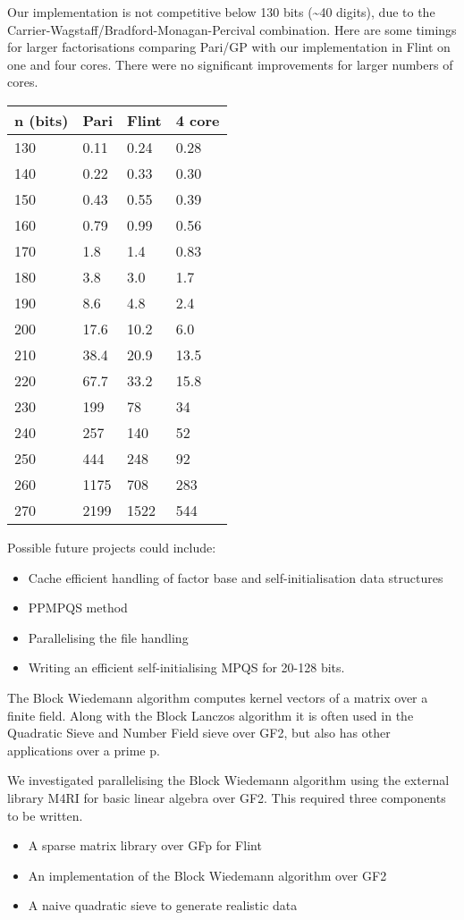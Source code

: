 Our implementation is not competitive below 130 bits
(\textasciitilde{}40 digits), due to the
Carrier-Wagstaff/Bradford-Monagan-Percival combination. Here are some
timings for larger factorisations comparing Pari/GP with our
implementation in Flint on one and four cores. There were no significant
improvements for larger numbers of cores.

\begin{longtable}[c]{@{}llll@{}}
\toprule
n (bits) & Pari & Flint & 4 core\tabularnewline
\midrule
\endhead
130 & 0.11 & 0.24 & 0.28\tabularnewline
140 & 0.22 & 0.33 & 0.30\tabularnewline
150 & 0.43 & 0.55 & 0.39\tabularnewline
160 & 0.79 & 0.99 & 0.56\tabularnewline
170 & 1.8 & 1.4 & 0.83\tabularnewline
180 & 3.8 & 3.0 & 1.7\tabularnewline
190 & 8.6 & 4.8 & 2.4\tabularnewline
200 & 17.6 & 10.2 & 6.0\tabularnewline
210 & 38.4 & 20.9 & 13.5\tabularnewline
220 & 67.7 & 33.2 & 15.8\tabularnewline
230 & 199 & 78 & 34\tabularnewline
240 & 257 & 140 & 52\tabularnewline
250 & 444 & 248 & 92\tabularnewline
260 & 1175 & 708 & 283\tabularnewline
270 & 2199 & 1522 & 544\tabularnewline
\bottomrule
\end{longtable}

Possible future projects could include:

\begin{itemize}
\tightlist
\item
  Cache efficient handling of factor base and self-initialisation data
  structures
\item
  PPMPQS method
\item
  Parallelising the file handling
\item
  Writing an efficient self-initialising MPQS for 20-128 bits.
\end{itemize}

The Block Wiedemann algorithm computes kernel vectors of a matrix over a
finite field. Along with the Block Lanczos algorithm it is often used in
the Quadratic Sieve and Number Field sieve over GF2, but also has other
applications over a prime p.

We investigated parallelising the Block Wiedemann algorithm using the
external library M4RI for basic linear algebra over GF2. This required
three components to be written.

\begin{itemize}
\tightlist
\item
  A sparse matrix library over GFp for Flint
\item
  An implementation of the Block Wiedemann algorithm over GF2
\item
  A naive quadratic sieve to generate realistic data
\end{itemize}

